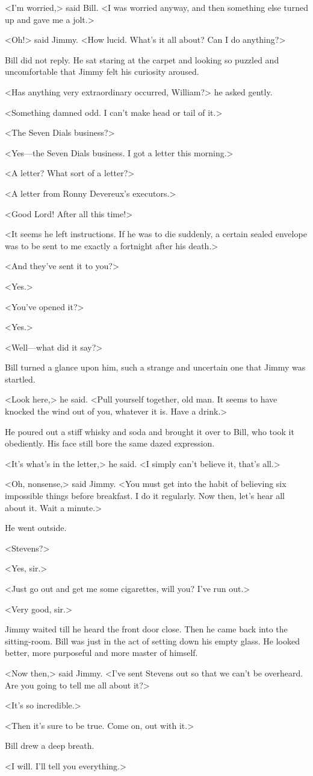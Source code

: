 <I'm worried,> said Bill. <I was worried anyway, and then something else turned up and gave me a jolt.>

<Oh!> said Jimmy. <How lucid. What's it all about? Can I do anything?>

Bill did not reply. He sat staring at the carpet and looking so puzzled and uncomfortable that Jimmy felt his curiosity aroused.

<Has anything very extraordinary occurred, William?> he asked gently.

<Something damned odd. I can't make head or tail of it.>

<The Seven Dials business?>

<Yes—the Seven Dials business. I got a letter this morning.>

<A letter? What sort of a letter?>

<A letter from Ronny Devereux's executors.>

<Good Lord! After all this time!>

<It seems he left instructions. If he was to die suddenly, a certain sealed envelope was to be sent to me exactly a fortnight after his death.>

<And they've sent it to you?>

<Yes.>

<You've opened it?>

<Yes.>

<Well—what did it say?>

Bill turned a glance upon him, such a strange and uncertain one that Jimmy was startled.

<Look here,> he said. <Pull yourself together, old man. It seems to have knocked the wind out of you, whatever it is. Have a drink.>

He poured out a stiff whisky and soda and brought it over to Bill, who took it obediently. His face still bore the same dazed expression.

<It's what's in the letter,> he said. <I simply can't believe it, that's all.>

<Oh, nonsense,> said Jimmy. <You must get into the habit of believing six impossible things before breakfast. I do it regularly. Now then, let's hear all about it. Wait a minute.>

He went outside.

<Stevens?>

<Yes, sir.>

<Just go out and get me some cigarettes, will you? I've run out.>

<Very good, sir.>

Jimmy waited till he heard the front door close. Then he came back into the sitting-room. Bill was just in the act of setting down his empty glass. He looked better, more purposeful and more master of himself.

<Now then,> said Jimmy. <I've sent Stevens out so that we can't be overheard. Are you going to tell me all about it?>

<It's so incredible.>

<Then it's sure to be true. Come on, out with it.>

Bill drew a deep breath.

<I will. I'll tell you everything.>